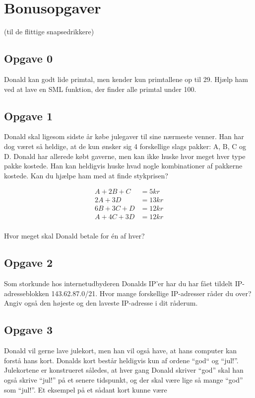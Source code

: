 \section{\huge{Bonusopgaver}}
(til de flittige snapsedrikkere)


\subsection{Opgave 0}

Donald kan godt lide primtal, men kender kun primtallene op til 29. Hjælp ham
ved at lave en SML funktion, der finder alle primtal under 100.



\subsection{Opgave 1}
Donald skal ligesom sidste år købe julegaver til sine nærmeste venner.
Han har dog været så heldige, at de kun ønsker sig 4 forskellige slags pakker:
A, B, C og D. Donald har allerede købt gaverne, men kan ikke huske hvor meget
hver type pakke kostede. Han kan heldigvis huske hvad nogle kombinationer
af pakkerne kostede. Kan du hjælpe ham med at finde stykprisen?

\begin{align*}
A + 2B + C &= 5kr \\
2A + 3D &= 13kr \\
6B + 3C + D &= 12kr \\
A + 4C + 3D &= 12kr \\
\end{align*}

Hvor meget skal Donald betale for én af hver?



\subsection{Opgave 2}
Som storkunde hos internetudbyderen Donalds IP'er har du har fået tildelt
IP-adresseblokken 143.62.87.0/21. Hvor mange forskellige IP-adresser råder du
over? Angiv også den højeste og den laveste IP-adresse i dit råderum.

\subsection{Opgave 3}
Donald vil gerne lave julekort, men han vil også have, at hans computer kan
forstå hans kort. Donalds kort består heldigvis kun af ordene ``god`` og
``jul!''. Julekortene er konstrueret således, at hver gang Donald skriver
``god'' skal han også skrive ``jul!'' på et senere tidspunkt, og der skal være
lige så mange ``god'' som ``jul!''. Et eksempel på et sådant kort kunne være

